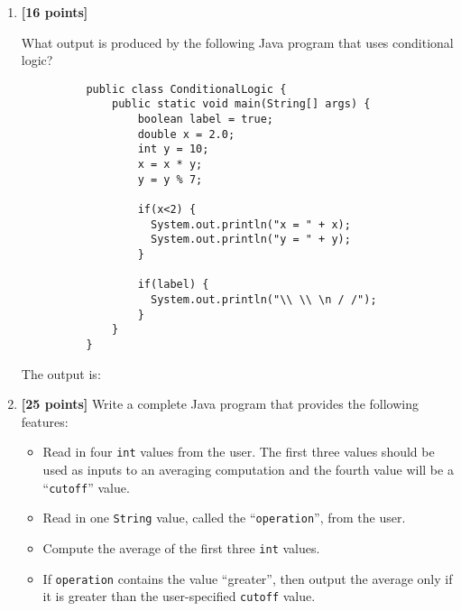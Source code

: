 \begin{enumerate}
\vspace*{-.175in}
The value is: \mbox{\underline{\hspace{3in}}}

\begin{verbatim}
(done || !done)
\end{verbatim}	

\vspace*{-.175in}
The value is: \mbox{\underline{\hspace{3in}}}

\item {\bf [16 points]}

What output is produced by the following Java program that uses conditional logic? 
\begin{verbatim}
          public class ConditionalLogic {
              public static void main(String[] args) {
                  boolean label = true;
                  double x = 2.0;
                  int y = 10;
                  x = x * y;
                  y = y % 7;

                  if(x<2) {
                    System.out.println("x = " + x);
                    System.out.println("y = " + y);
                  }

                  if(label) {
                    System.out.println("\\ \\ \n / /");
                  }
              }
          }
\end{verbatim}
\vspace*{-.05in}
The output is:
\vspace{1in}

\item {\bf [25 points]}
Write a complete Java program that provides the following features:
\begin{itemize}

  \item Read in four {\tt int} values from the user.  The first three values should be used as inputs to an averaging
    computation and the fourth value will be a ``{\tt cutoff}'' value.

  \item Read in one {\tt String} value, called the ``{\tt operation}'', from the user.

  \item Compute the average of the first three {\tt int} values.

  \item If {\tt operation} contains the value ``greater'', then output the average only if it is greater than the
    user-specified {\tt cutoff} value.


\end{itemize}
\end{enumerate}
